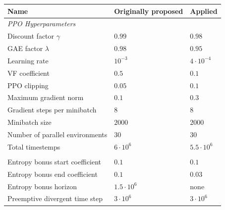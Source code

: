 \begin{table}[htbp]
    \small
    \centering
    \begin{tabular}{lll}
      \toprule
      \textbf{Name}                                & Originally proposed     & \textbf{Applied}         \\ \midrule
      \textit{PPO Hyperparameters}     &                                   &                                   \\ \midrule            
      Discount factor $\gamma$                     & $0.99$                            & $0.98$                            \\
      GAE factor $\lambda$                         & $0.98$                            & $0.95$                            \\
      Learning rate                                & $10^{-3}$                         & $4 \cdot 10^{-4}$                               \\
      VF coefficient                               & $0.5$                             & $0.1$                             \\
      PPO clipping                                 & $0.05$                            & $0.1$                             \\
      Maximum gradient norm                        & $0.1$                             & $0.3$                             \\
      Gradient steps per minibatch                 & $8$                               & $8$                               \\      
      Minibatch size                               & $2000$                            & $2000$                            \\
      Number of parallel environments              & $30$                              & $30$                              \\
      Total timestemps                             & $6\cdot10^6$                      & $5.5 \cdot 10^6$                  \\            \\
      Entropy bonus start coefficient              & $0.1$                             & $0.1$                             \\
      Entropy bonus end coefficient                & $0.1$                             & $0.03$                            \\
      Entropy bonus horizon                        & $1.5\cdot 10^6$                   & none                              \\
      Preemptive divergent time step               & $3\cdot 10^6$                     & $3\cdot 10^6$                     \\
      \midrule
  

\end{tabular}
\end{table}

